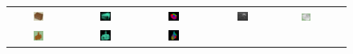 \documentclass[10pt,twocolumn,letterpaper]{article}
\begin{document}
\begin{figure}[htbp]
\begin{center}
\begin{tabular}{cccccc}
\includegraphics[width=0.18\textwidth]{cu_1.png} &
\includegraphics[width=0.18\textwidth]{cu_2.png} &
\includegraphics[width=0.18\textwidth]{cu_7.png} &
\includegraphics[width=0.18\textwidth]{cu_9.png} &
\includegraphics[width=0.18\textwidth]{cu_3.png} \\
\includegraphics[width=0.18\textwidth]{spitak_1.png} &
\includegraphics[width=0.18\textwidth]{spitak_2.png} &
\includegraphics[width=0.18\textwidth]{spitak_7.png} &

\end{tabular}
\end{center}
\end{figure}
\end{document}
